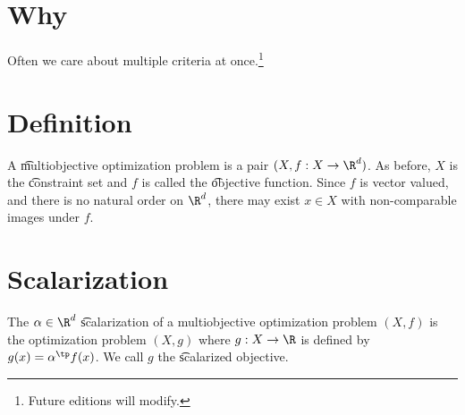 
\section*{Why}

Often we care about multiple criteria at once.\footnote{Future editions will modify.}

\section*{Definition}

A \t{multiobjective optimization problem} is a pair $(X, f: X \to \R ^d)$.
As before, $X$ is the \t{constraint set} and $f$ is called the \t{objective function}.
Since $f$ is vector valued, and there is no natural order on $\R ^d$, there may exist $x \in X$ with non-comparable images under $f$.

\section*{Scalarization}

The $\alpha  \in \R ^d$ \t{scalarization} of a multiobjective optimization problem $(X, f)$ is the optimization problem $(X, g)$ where $g: X \to \R $ is defined by $g(x) = \alpha ^\tp f(x)$.
We call $g$ the \t{scalarized objective}.

\blankpage